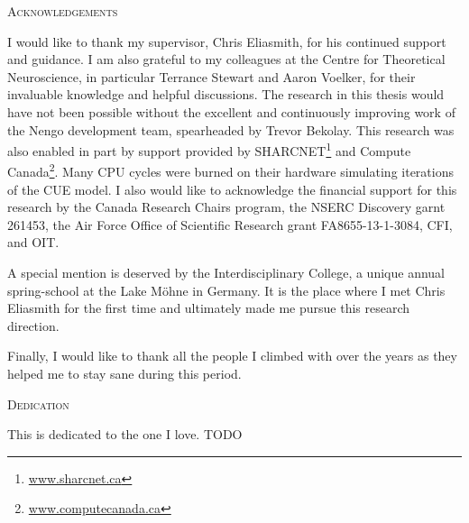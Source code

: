 \begin{center}\textsc{Acknowledgements}\end{center}
I would like to thank my supervisor, Chris Eliasmith, for his continued support and guidance.
I am also grateful to my colleagues at the Centre for Theoretical Neuroscience, in particular Terrance Stewart and Aaron Voelker, for their invaluable knowledge and helpful discussions.
The research in this thesis would have not been possible without the excellent and continuously improving work of the Nengo development team, spearheaded by Trevor Bekolay.
This research was also enabled in part by support provided by SHARCNET\footnote{\href{https://www.sharcnet.ca}{www.sharcnet.ca}} and Compute Canada\footnote{\href{https://www.computecanada.ca}{www.computecanada.ca}}.
Many CPU cycles were burned on their hardware simulating iterations of the CUE model.
I also would like to acknowledge the financial support for this research by the Canada Research Chairs program, the NSERC Discovery garnt 261453, the Air Force Office of Scientific Research grant FA8655-13-1-3084, CFI, and OIT\@.  %

A special mention is deserved by the Interdisciplinary College, a unique annual spring-school at the Lake Möhne in Germany.
It is the place where I met Chris Eliasmith for the first time and ultimately made me pursue this research direction.

Finally, I would like to thank all the people I climbed with over the years as they helped me to stay sane during this period.


\cleardoublepage


\begin{center}\textsc{Dedication}\end{center}

This is dedicated to the one I love. TODO
\cleardoublepage

\renewcommand\contentsname{Table of Contents}
\tableofcontents
\cleardoublepage

\listoftables
\cleardoublepage

\listoffigures
\cleardoublepage

\printglossaries
\cleardoublepage

\pagestyle{headings}
